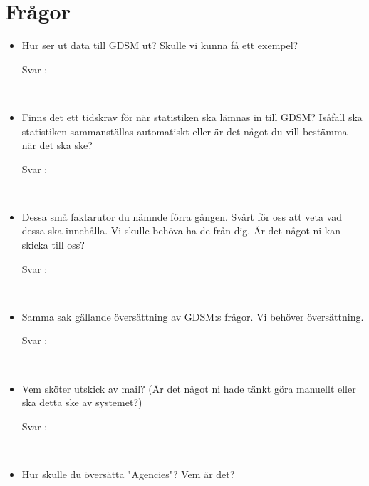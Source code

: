 \documentclass{article}
\date {#1}
\title {
    \documentTitle {Helsingborg Event and Convention Bureau}
    
    \documentDate {}
}
\begin{document}
\maketitle
\thispagestyle{empty}

\newpage




\newpage

\section{Frågor}

 
\begin{itemize}
    \item Hur ser ut data till GDSM ut? Skulle vi kunna få ett exempel?
        \begin{description}
            \item[Svar :]
        \end{description}
    \\
     \item Finns det ett tidskrav för när statistiken ska lämnas in till GDSM? Isåfall ska statistiken sammanställas automatiskt eller är det något du vill bestämma när det ska ske?
        \begin{description}
            \item[Svar :]
        \end{description}
    \\
    \item Dessa små faktarutor du nämnde förra gången. Svårt för oss att veta vad dessa ska innehålla. Vi skulle behöva ha de från dig. Är det något ni kan skicka till oss?
        \begin{description}
            \item[Svar :]
        \end{description}  
    \\
     \item Samma sak gällande översättning av GDSM:s frågor. Vi behöver översättning.
        \begin{description}
            \item[Svar :]
        \end{description}
    \\
    \item Vem sköter utskick av mail? (Är det något ni hade tänkt göra manuellt eller ska detta ske av systemet?)
        \begin{description}
            \item[Svar :]
        \end{description}
    \\
    \item Hur skulle du översätta "Agencies"? Vem är det?
\end{itemize}
\end{document}
